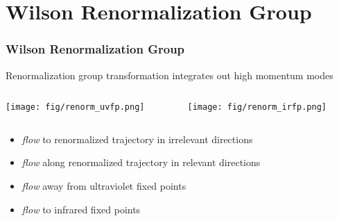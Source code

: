 
\section{Wilson Renormalization Group}
\addtocounter{framenumber}{-1}

\begin{frame}
  \frametitle{Wilson Renormalization Group}
  Renormalization group transformation integrates out high momentum modes
  \begin{columns}[T]
    \begin{column}{.5\textwidth}
      \begin{block}{}
        \texttt{[image: fig/renorm\_uvfp.png]}
      \end{block}
    \end{column}
    \begin{column}{.5\textwidth}
      \begin{block}{}
        \texttt{[image: fig/renorm\_irfp.png]}
      \end{block}
    \end{column}
  \end{columns}
  \begin{itemize}
    \item \emph{\textcolor{flow}{flow}} to \textcolor{renorm_traj}{renormalized trajectory} in irrelevant directions
    \item \emph{\textcolor{flow}{flow}} along \textcolor{renorm_traj}{renormalized trajectory} in relevant directions
    \item \emph{\textcolor{flow}{flow}} away from \textcolor{uvfp}{ultraviolet fixed points}
    \item \emph{\textcolor{flow}{flow}} to \textcolor{irfp}{infrared fixed points}
  \end{itemize}
\end{frame}

